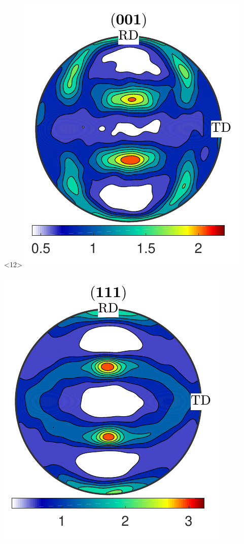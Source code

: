 \documentclass[compress]{beamer}
\begin{document}
\begin{frame}[fragile]
\begin{columns}
\begin{column}{0.29\textwidth}
                        \begin{onlyenv}<12>
        \includegraphics[width=\textwidth]{pic/rolling001_9}

      \includegraphics[width=\textwidth]{pic/rolling111_9}
    \end{onlyenv}


\end{column}
\end{columns}
\end{frame}
\end{document}
